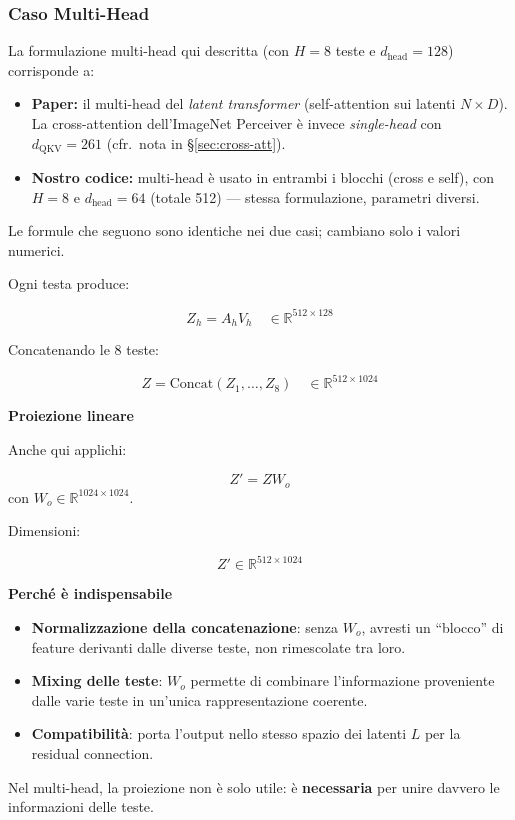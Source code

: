 \documentclass[
  11pt,
]{article}
\begin{document}
\subsubsection{Caso Multi-Head}

\begin{notabox}[title={\textbf{A quale modulo si riferisce questa sezione?}}]
La formulazione multi-head qui descritta (con $H = 8$ teste e $d_{\text{head}} = 128$) corrisponde a:
\begin{itemize}
\item \textbf{Paper:} il multi-head del \emph{latent transformer} (self-attention sui latenti $N \times D$). La cross-attention dell'ImageNet Perceiver è invece \emph{single-head} con $d_{\text{QKV}} = 261$ (cfr.\ nota in \S\ref{sec:cross-att}).
\item \textbf{Nostro codice:} multi-head è usato in entrambi i blocchi (cross e self), con $H = 8$ e $d_{\text{head}} = 64$ (totale 512) --- stessa formulazione, parametri diversi.
\end{itemize}
Le formule che seguono sono identiche nei due casi; cambiano solo i valori numerici.
\end{notabox}

Ogni testa produce:

\[
Z_h = A_h V_h \quad \in \mathbb{R}^{512 \times 128}
\]

Concatenando le 8 teste:

\[
Z = \text{Concat}(Z_1, \ldots, Z_8) \quad \in \mathbb{R}^{512 \times 1024}
\]

\textbf{Proiezione lineare}

Anche qui applichi:

\[
Z' = Z W_o
\]
con $W_o \in \mathbb{R}^{1024 \times 1024}$.

Dimensioni:

\[
Z' \in \mathbb{R}^{512 \times 1024}
\]

\textbf{Perché è indispensabile}
\begin{itemize}
\item \textbf{Normalizzazione della concatenazione}: senza $W_o$, avresti un ``blocco'' di feature derivanti dalle diverse teste, non rimescolate tra loro.
\item \textbf{Mixing delle teste}: $W_o$ permette di combinare l'informazione proveniente dalle varie teste in un'unica rappresentazione coerente.
\item \textbf{Compatibilità}: porta l'output nello stesso spazio dei latenti $L$ per la residual connection.
\end{itemize}
Nel multi-head, la proiezione non è solo utile: è \textbf{necessaria} per unire davvero le informazioni delle teste.
\end{document}
